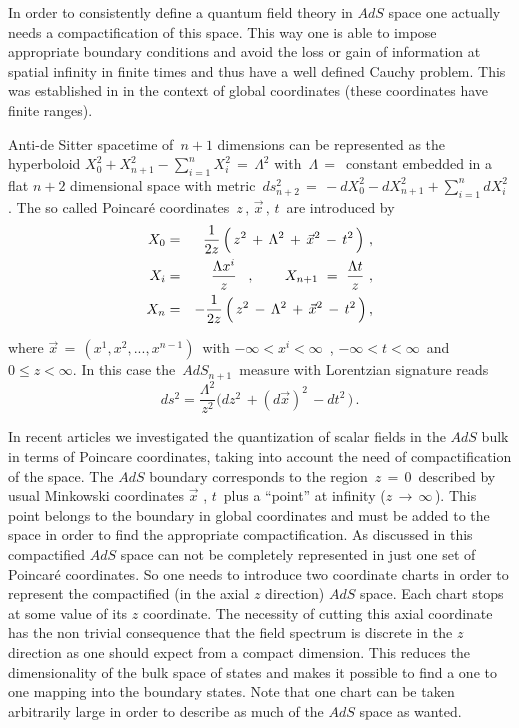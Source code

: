 \documentclass[a4paper,12pt]{article}
\begin{document}
In order to consistently define a quantum field theory in $AdS$ space 
one actually needs a compactification of this space.
This way one is able to impose appropriate boundary conditions  
and avoid the loss or gain of information at spatial infinity in finite 
times and thus have a well defined Cauchy problem. 
This was established in \cite{QAdS1,QAdS2} in the context of 
global coordinates (these coordinates  have finite ranges).
  
Anti-de Sitter spacetime of $\,n+1$ dimensions can be represented\cite{Pe,Malda2} 
as the hyperboloid $X_0^2 + X_{n+1}^2 - \sum_{i=1}^n X_i^2\,=\,\Lambda^2 $
with $\,\Lambda\,=\,$ constant embedded in a flat $n+2$ dimensional space with metric 
$\, ds^2_{n+2}\,=\, - d X_0^2 - dX_{n+1}^2 + \sum_{i=1}^n dX_i^2\,$.
The so called Poincar\'e coordinates $\,z \,,\, \vec x\,,\,t\,$ are introduced by
\begin{eqnarray}
\label{Poincare}
X_0 &=& {1\over 2z}\,\Big( \,z^2\,+\,\Lambda^2\,
+\,{ \vec x}^2\,-\,t^2\,\Big)\,\,,
\nonumber\\
X_i &=& {\Lambda x^i \over z}\,\,\,\,\,,\,\,\,\,\,\,\,\,\,\,\,\,\,
X_{n+1} \,\,=\,\, {\Lambda t \over z}\,\,,
\nonumber\\
X_n &=& - {1\over 2z}\,
\Big( \,z^2\,-\,\Lambda^2\,+\,{\vec x}^2\,-\,t^2\,\Big)\,,
\end{eqnarray}

\noindent where $\vec  x \,=\, (x^1 , x^2 , ..., x^{n-1})\,$ with 
$ -\infty < x^i < \infty\,$ , $ -\infty < t < \infty\,$ and 
 $0 \le z < \infty $. In this case the $\,AdS_{n+1}\,$ measure with 
Lorentzian signature reads
\begin{equation}
\label{metric}
ds^2=\frac {\Lambda^2 }{ z^2}\Big( dz^2 \,+(d\vec x)^2\,
- dt^2 \,\Big)\,.
 \end{equation}
\noindent 

In recent articles \cite{BB1,BB2} we investigated the quantization of scalar 
fields  in the $AdS$ bulk in terms of Poincare coordinates, taking into account the
need of compactification of the space.
The $AdS$ boundary  corresponds to the region $\,z\,=\,0\,$ 
described by usual Minkowski coordinates $\vec x$ , $t\,$ plus 
a ``point'' at infinity ($z\,\rightarrow\,\infty\,$).
This point belongs to the boundary  in global coordinates
and must be added to the space in order to
find the appropriate compactification.
As discussed in \cite{BB1,BB2} this compactified $AdS$ space can not be completely 
represented in just one set of Poincar\'e coordinates. 
So one needs to introduce two coordinate charts in order to 
represent the compactified (in the axial $z$ direction) $AdS$ space. 
Each chart stops at some value of its $z$ coordinate.
The necessity of cutting this axial coordinate has 
the non trivial consequence that the field spectrum is discrete
in the $z$ direction as one should expect from a compact 
dimension. This reduces the dimensionality of the bulk space of states 
and makes it possible to find a one to one mapping  into the  boundary  states.
Note that one chart can be taken arbitrarily large in order to describe as much
of the $AdS$ space as wanted.
\end{document}
